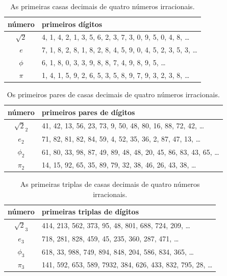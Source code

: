 \documentclass[12pt,a4paper,fleqn]{report}
\begin{document}
\begin{table}[h]
\begin{center}
\caption{As primeiras casas decimais de quatro números irracionais.}
    \begin{tabular}{|c|l|}
    \hline
        número & primeiros dígitos \\
        \hline $\sqrt{2}$ & 4, 1, 4, 2, 1, 3, 5, 6, 2, 3, 7, 3, 0, 9, 5, 0, 4, 8, \ldots \\
        $e$ & 7, 1, 8, 2, 8, 1, 8, 2, 8, 4, 5, 9, 0, 4, 5, 2, 3, 5, 3, \ldots \\
        $\phi$ & 6, 1, 8, 0, 3, 3, 9, 8, 8, 7, 4, 9, 8, 9, 5, \ldots \\
        $\pi$ & 1, 4, 1, 5, 9, 2, 6, 5, 3, 5, 8, 9, 7, 9, 3, 2, 3, 8, \ldots \\
        \hline
    \end{tabular}
\end{center}
\end{table}




\begin{table}[h]
\begin{center}
\caption{Os primeiros pares de casas decimais de quatro números irracionais.}
    \begin{tabular}{|c|l|}
    \hline
        número & primeiros pares de dígitos \\ 
        \hline $\sqrt{2}_2$ & 41, 42, 13, 56, 23, 73, 9, 50, 48, 80, 16, 88, 72, 42, \ldots \\
        $e_2$ & 71, 82, 81, 82, 84, 59, 4, 52, 35, 36, 2, 87, 47, 13, \ldots \\
        $\phi_2$ & 61, 80, 33, 98, 87, 49, 89, 48, 48, 20, 45, 86, 83, 43, 65, \ldots \\
        $\pi_2$ & 14, 15, 92, 65, 35, 89, 79, 32, 38, 46, 26, 43, 38, \ldots \\
        \hline
    \end{tabular}
\end{center}
\end{table}


\begin{table}[h]
\begin{center}
\caption{As primeiras triplas de casas decimais de quatro números irracionais.}
    \begin{tabular}{|c|l|}
    \hline
         número & primeiras triplas de dígitos \\ 
        \hline $\sqrt{2}_3$ & 414, 213, 562, 373, 95, 48, 801, 688, 724, 209, \ldots \\
        $e_3$ & 718, 281, 828, 459, 45, 235, 360, 287, 471, \ldots \\
        $\phi_3$ & 618, 33, 988, 749, 894, 848, 204, 586, 834, 365, \ldots \\
        $\pi_3$ & 141, 592, 653, 589, 7932, 384, 626, 433, 832, 795, 28, \ldots \\
        \hline
    \end{tabular}
\end{center}
\end{table}
\end{document}
